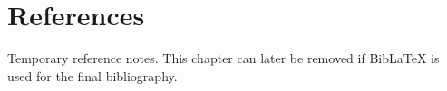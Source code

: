 \chapter{References}

Temporary reference notes. This chapter can later be removed if BibLaTeX is used for the final bibliography.
